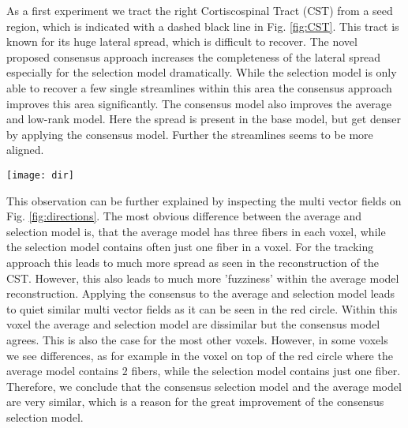 As a first experiment we tract the right Cortiscospinal Tract (CST) from a seed
region, which is indicated with a dashed black line in Fig. \ref{fig:CST}. This tract is
known for its huge lateral spread, which is difficult to recover. The
novel proposed consensus approach increases the completeness of the lateral
spread especially for the selection model dramatically. While the selection
model is only able to recover a few single streamlines within this area the
consensus approach improves this area significantly. The consensus model also
improves the average and low-rank model. Here the spread is present in the base
model, but get denser by applying the consensus model. Further the streamlines
seems to be more aligned.

\begin{figure*}[h]
	\centering
	\texttt{[image: dir]}
	\caption{Reconstructed fiber orientations of the different models, the
	red box in the left image denotes the position within the brain. Top row
shows models without consensus bootstrapping, bottom row with consensus
bootstrapping. Left: Averaging model. Right: selection model. Both consensus
models coincide in most voxels very well, although the base models differ as it
is visible in the red circled voxel.}
	\label{fig:directions}
\end{figure*}

This observation can be further explained by inspecting the multi vector fields
on Fig. \ref{fig:directions}. The most obvious difference between the average and
selection model is, that the average model has three fibers in
each voxel, while the selection model contains often just one fiber in a voxel.
For the tracking approach this leads to much more spread as seen in the
reconstruction of the CST. However, this also leads to much more 'fuzziness'
within the average model reconstruction. 
Applying the consensus to the average
and selection model leads to quiet similar multi vector fields as it can be seen
in the red circle. Within this voxel the average and selection model are
dissimilar but the consensus model agrees. This is also the case for the most
other voxels. However, in some voxels we see differences, as for example in the
voxel on top of the red circle where the average model contains $2$ fibers,
while the selection model contains just one fiber. Therefore, we conclude that
the consensus selection model and the average model are very similar, which is a
reason for the great improvement of the consensus selection model. 

